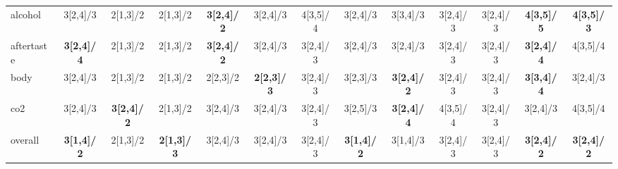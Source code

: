 \begin{landscape}
\begin{longtable}{lcccccccccccc}
alcohol & 3[2,4]/3 & 2[1,3]/2 & 2[1,3]/2 & \textbf{3[2,4]/2} & 3[2,4]/3 & 4[3,5]/4 & 3[2,4]/3 & 3[3,4]/3 & 3[2,4]/3 & 3[2,4]/3 & \textbf{4[3,5]/5} & \textbf{4[3,5]/3} \\
aftertaste & \textbf{3[2,4]/4} & 2[1,3]/2 & 2[1,3]/2 & \textbf{3[2,4]/2} & 3[2,4]/3 & 3[2,4]/3 & 3[2,4]/3 & 3[2,4]/3 & 3[2,4]/3 & 3[2,4]/3 & \textbf{3[2,4]/4} & 4[3,5]/4 \\
body & 3[2,4]/3 & 2[1,3]/2 & 2[1,3]/2 & 2[2,3]/2 & \textbf{2[2,3]/3} & 3[2,4]/3 & 3[2,3]/3 & \textbf{3[2,4]/2} & 3[2,4]/3 & 3[2,4]/3 & \textbf{3[3,4]/4} & 3[2,4]/3 \\
co2 & 3[2,4]/3 & \textbf{3[2,4]/2} & 2[1,3]/2 & 3[2,4]/3 & 3[2,4]/3 & 3[2,4]/3 & 3[2,5]/3 & \textbf{3[2,4]/4} & 4[3,5]/4 & 3[2,4]/3 & 3[2,4]/3 & 4[3,5]/4 \\
overall & \textbf{3[1,4]/2} & 2[1,3]/2 & \textbf{2[1,3]/3} & 3[2,4]/3 & 3[2,4]/3 & 3[2,4]/3 & \textbf{3[1,4]/2} & 3[1,4]/3 & 3[2,4]/3 & 3[2,4]/3 & \textbf{3[2,4]/2} & \textbf{3[2,4]/2} \\
\end{longtable}
\end{landscape}
